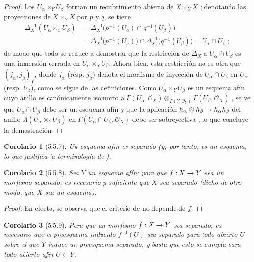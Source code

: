 \documentclass[oneside]{amsart}
\theoremstyle{ega-env-style}
\theoremstyle{ega-thm-env-style}
\newtheorem*{corollary}{Corolario}
\theoremstyle{ega-defn-env-style}
\renewcommand{\to}{\mathchoice{\longrightarrow}{\rightarrow}{\rightarrow}{\rightarrow}}
\let\EGAOriginalLabel\label
\renewcommand{\label}[1]{\phantomsection\EGAOriginalLabel{#1}}
\begin{document}
\begin{proof}
Los $U_\alpha\times_Y U_\beta$ forman un recubrimiento abierto de $X\times_Y X$ ;
denotando las proyecciones de $X\times_Y X$ por $p$ y $q$, se tiene
\[
  \begin{aligned}
    \Delta_X^{-1}(U_\alpha\times_Y U_\beta)
      &=\Delta_X^{-1}\bigl(p^{-1}(U_\alpha)\cap q^{-1}(U_\beta)\bigr)\\
      &=\Delta_X^{-1}\bigl(p^{-1}(U_\alpha)\bigr)
        \cap\Delta_X^{-1}\bigl(q^{-1}(U_\beta)\bigr)
        =U_\alpha\cap U_\beta~;
  \end{aligned}
\]
de modo que todo se reduce a demostrar que la restricción de $\Delta_X$ a $U_\alpha\cap U_\beta$ es una inmersión cerrada en $U_\alpha\times_Y U_\beta$.
Ahora bien, esta restricción no es otra que $(j_\alpha,j_\beta)_Y$, donde $j_\alpha$ (resp. $j_\beta$) denota el morfismo de inyección de $U_\alpha\cap U_\beta$ en $U_\alpha$ (resp. $U_\beta$), como se sigue de las definiciones.
Como $U_\alpha\times_Y U_\beta$ es un esquema afín cuyo anillo es canónicamente isomorfo a $\Gamma(U_\alpha,\mathscr{O}_X)
 \otimes_{\Gamma(Y,\mathscr{O}_Y)}
 \Gamma(U_\beta,\mathscr{O}_X)$ , se ve que $U_\alpha\cap U_\beta$ debe ser un esquema afín y que la aplicación $h_\alpha\otimes h_\beta\to h_\alpha h_\beta$ del anillo $A(U_\alpha\times_Y U_\beta)$ en $\Gamma(U_\alpha\cap U_\beta,\mathscr{O}_X)$ debe ser sobreyectiva , lo que concluye la demostración.
\end{proof}

\begin{corollary}[5.5.7]
\label{I.5.5.7}
Un esquema afín es separado \textup{(y, por tanto, es un \emph{esquema}, lo que justifica la terminología de )}.
\end{corollary}

\begin{corollary}[5.5.8]
\label{I.5.5.8}
Sea $Y$ un esquema afín;
para que $f:X\to Y$ sea un morfismo separado, es necesario y suficiente que $X$ sea separado \textup{(dicho de otro modo, que $X$ sea un \emph{esquema})}.
\end{corollary}

\begin{proof}
En efecto, se observa que el criterio de  no depende de $f$.
\end{proof}

\begin{corollary}[5.5.9]
\label{I.5.5.9}
Para que un morfismo $f:X\to Y$ sea separado, es necesario que el preesquema inducido $f^{-1}(U)$ sea separado para todo abierto $U$ sobre el que $Y$ induce un preesquema separado, y basta que esto se cumpla para todo abierto afín $U\subset Y$.
\end{corollary}
\end{document}
